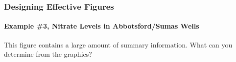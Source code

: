 \documentclass[10pt]{beamer}
\begin{document}
\begin{frame}
\frametitle{Designing Effective Figures}
\framesubtitle{Example \#3, Nitrate Levels in Abbotsford/Sumas Wells}

\vspace*{-2ex}
\begin{center}
\end{center}

\vspace*{-2ex}
{\scriptsize This figure contains a large amount of summary information.  What can
  you determine from the graphics?\\}

\end{frame}
\end{document}
